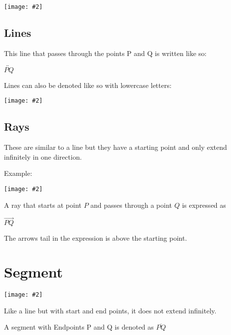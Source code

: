 \documentclass{article}
\newcommand{\img}[2][]{\texttt{[image: \#2]}}
\begin{document}
\img{line1.png}

\subsection{Lines}

This line that passes through the points P and Q is written like so:

$ \overleftrightarrow{PQ} $

Lines can also be denoted like so with lowercase letters:

\img{line2.png}

\subsection{Rays}
These are similar to a line but they have a starting point and only extend infinitely in one direction.

Example:

\img{ray1}

A ray that starts at point $P$ and passes through a point $Q$ is expressed as 

$\overrightarrow{PQ}$


The arrows tail in the expression is above the starting point.


\section{Segment}

\img{segment1}

Like a line but with start and end points, it does not extend infinitely.

A segment with Endpoints P and Q is denoted as $\overline{PQ}$
\end{document}
